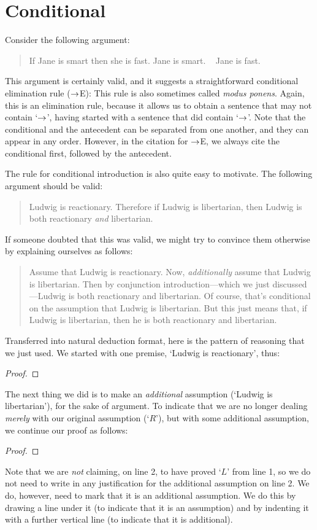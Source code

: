 \section{Conditional}
Consider the following argument:
	\begin{quote}
		If Jane is smart then she is fast. Jane is smart. \therefore~ Jane is fast.
	\end{quote}
This argument is certainly valid, and it suggests a straightforward conditional elimination rule ($\rightarrow$E):
This rule is also sometimes called \emph{modus ponens}. Again, this is an elimination rule, because it allows us to obtain a sentence that may not contain `$\rightarrow$', having started with a sentence that did contain `$\rightarrow$'. Note that the conditional and the antecedent can be separated from one another, and they can appear in any order. However, in the citation for $\rightarrow$E, we always cite the conditional first, followed by the antecedent.

The rule for conditional introduction is also quite easy to motivate. The following argument should be valid:
	\begin{quote}
		Ludwig is reactionary. Therefore if Ludwig is libertarian, then Ludwig is both reactionary \emph{and} libertarian.
	\end{quote}
If someone doubted that this was valid, we might try to convince them otherwise by explaining ourselves as follows:
	\begin{quote}
		Assume that Ludwig is reactionary. Now, \emph{additionally} assume that Ludwig is libertarian. Then by conjunction introduction---which we just discussed---Ludwig is both reactionary and libertarian. Of course, that's conditional on the assumption that Ludwig is libertarian. But this just means that, if Ludwig is libertarian, then he is both reactionary and libertarian.
	\end{quote}
Transferred into natural deduction format, here is the pattern of reasoning that we just used. We started with one premise, `Ludwig is reactionary', thus:
	\begin{proof}
	\end{proof}
The next thing we did is to make an \emph{additional} assumption (`Ludwig is libertarian'), for the sake of argument. To indicate that we are no longer dealing \emph{merely} with our original assumption (`$R$'), but with some additional assumption, we continue our proof as follows:
	\begin{proof}
		\open
	\end{proof}
Note that we are \emph{not} claiming, on line 2, to have proved `$L$' from line 1, so we do not need to write in any justification for the additional assumption on line 2. We do, however, need to mark that it is an additional assumption. We do this by drawing a line under it (to indicate that it is an assumption) and by indenting it with a further vertical line (to indicate that it is additional). 

